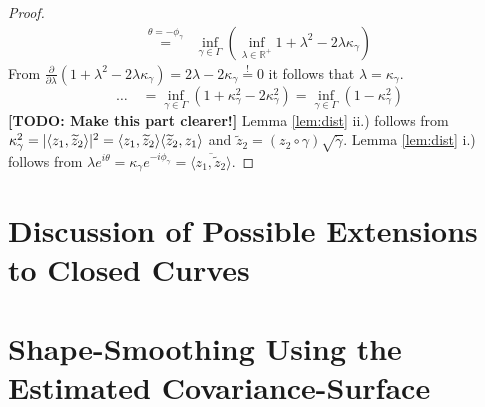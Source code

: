 \begin{proof}
\begin{align*}
     \overset{\theta = -\phi_\gamma}{=} & \inf_{\gamma \in \Gamma} \left( \inf_{\lambda \in \mathbb{R}^+} 1 + \lambda^2  - 2 \lambda \kappa_\gamma \right) 
  \end{align*}
  From $\frac{\partial}{\partial\lambda}\left( 1 + \lambda^2 - 2\lambda\kappa_\gamma \right) = 2\lambda - 2\kappa_\gamma \overset{!}{=} 0$ it follows that $\lambda = \kappa_\gamma$.
  $$\dots\quad = \inf_{\gamma \in \Gamma} \left( 1 + \kappa^2_\gamma  - 2 \kappa^2_\gamma \right) = \inf_{\gamma \in \Gamma} \left( 1 - \kappa^2_\gamma \right)$$
  \textbf{[TODO: Make this part clearer!]}
  Lemma \ref{lem:dist} ii.) follows from $\kappa^2_\gamma = \lvert\langle z_1, \widetilde z_2 \rangle\rvert^2 = \langle z_1, \widetilde z_2 \rangle \langle \widetilde z_2, z_1 \rangle$ and $\widetilde z_2 = (z_2 \circ \gamma) \sqrt{\dot\gamma}$.
  Lemma \ref{lem:dist} i.) follows from $\lambda e^{i\theta} = \kappa_\gamma e^{-i\phi_\gamma} = \overline{\langle z_1, \widetilde z_2 \rangle}$.
\end{proof}


\section{Discussion of Possible Extensions to Closed Curves}
\label{app:closed}


\section{Shape-Smoothing Using the Estimated Covariance-Surface}
